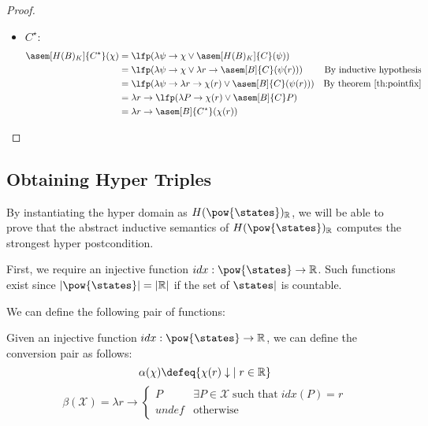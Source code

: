 \begin{proof}
\begin{itemize}
    \item $C^\star$:
      \begin{align*}
        \asem[H(B)_K]{C^\star}(\chi)
          &= \lfp(\lambda \psi \to 
            \chi \lor \asem[H(B)_K]{C}(\psi)) \\
          &= \lfp(\lambda \psi \to 
            \chi \lor \lambda r \to \asem[B]{C}(\psi(r)))
          &\text{By inductive hypothesis} \\
          &= \lfp(\lambda \psi \to \lambda r \to
            \chi(r) \lor \asem[B]{C}(\psi(r)))
          &\text{By theorem \ref{th:pointfix}} \\
          &= \lambda r \to \lfp(\lambda P 
            \to \chi(r) \lor \asem[B]{C} P) \\
          &= \lambda r \to \asem[B]{C^\star}(\chi(r))
      \end{align*}
  \end{itemize}
\end{proof}


\subsection{Obtaining Hyper Triples}

By instantiating the hyper domain as $H(\pow{\states})_{\mathbb{R}}$, we will be 
able to prove that the abstract inductive semantics of 
$H(\pow{\states})_{\mathbb{R}}$ computes the strongest hyper postcondition.

First, we require an injective function $idx : \pow{\states} \to \mathbb{R}$. 
Such functions exist since $|\pow{\states}| = |\mathbb{R}|$ if the set of 
$\states|$ is countable.

We can define the following pair of functions:
\begin{definition}
  Given an injective function $idx : \pow{\states} \to \mathbb{R}$, we can 
  define the conversion pair as follows:
  $$\alpha(\chi) \defeq \{ \chi(r) \downarrow \; \mid r \in \mathbb{R} \}$$
  $$\beta(\mathcal{X}) = \lambda r \to \begin{cases}
    P              & \exists P \in \mathcal{X} \; \text{such that} \; idx(P) = r \\
    \textit{undef} & \text{otherwise}
  \end{cases}$$
\end{definition}

